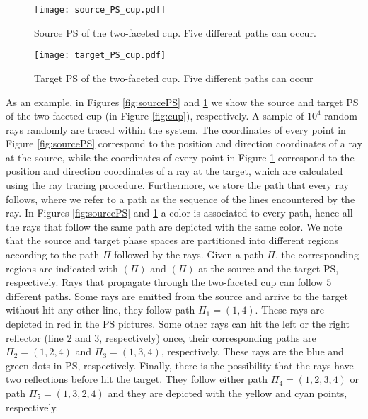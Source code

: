 \begin{figure}[h]
  \begin{minipage}[]{0.49\textwidth}
\centering
    \texttt{[image: source\_PS\_cup.pdf]}
    \caption{Source PS of the two-faceted cup. Five different paths can occur.}
    \label{fig:sourcePS}
  \end{minipage}
\hspace{0.2cm}
  \begin{minipage}[]{0.49\textwidth}
\centering
    \texttt{[image: target\_PS\_cup.pdf]}
  \caption{Target PS of the two-faceted cup. Five different paths can occur}
   \label{fig:targetPS}
 \end{minipage}
\end{figure}
As an example, in Figures \ref{fig:sourcePS} and \ref{fig:targetPS} we show the source and target PS of the two-faceted cup (in Figure \ref{fig:cup}), respectively.
A sample of $10^4$ random rays randomly are traced within the system. The coordinates of every point in Figure \ref{fig:sourcePS} correspond to the position and direction coordinates of a ray at the source, while the coordinates of every point in Figure \ref{fig:targetPS} correspond to the position and direction coordinates of a ray at the target, which are calculated using the ray tracing procedure. Furthermore, we store the path that every ray follows, where we refer to a path as the sequence of the lines encountered by the ray.
In Figures \ref{fig:sourcePS} and \ref{fig:targetPS} a color is associated to every path, hence all the rays that follow the same path are depicted with the same color.
We note that the source and target phase spaces are partitioned into different regions according to the path $\Pi$ followed by the rays.
Given a path $\Pi$, the corresponding regions are indicated with $(\Pi)$ and $(\Pi)$ at the source and the target PS, respectively.
Rays that propagate through the two-faceted cup can follow $5$ different paths. Some rays are emitted from the source and arrive to the target without hit any other line, they follow path $\Pi_1= (1,4)$. These rays are depicted in red in the PS pictures. Some other rays can hit the left or the right reflector (line $2$ and $3$, respectively) once, their corresponding paths are $\Pi_2 = (1,2,4)$ and $\Pi_3 = (1,3,4)$, respectively. These rays are the blue and green dots in PS, respectively. Finally, there is the possibility that the rays have two reflections before hit the target. They follow either path $\Pi_4 = (1,2,3,4)$ or path $\Pi_5 = (1,3,2,4)$ and they are depicted with the yellow and cyan points, respectively.
